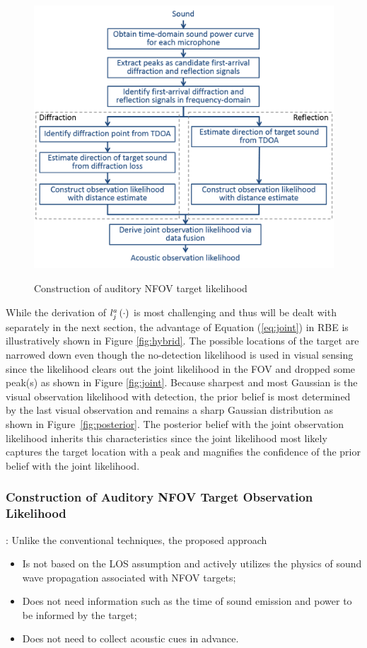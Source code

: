 \documentclass[letterpaper, 10 pt, conference]{ieeeconf}  %
\begin{document}
\begin{figure}[h]
	{\centering
		\includegraphics[height=0.40\textwidth]{Figures/auditory_procedure.png}
	}
	\caption{\footnotesize {Construction of auditory NFOV target likelihood} }
	\label{fig:auditory_procedure}
\end{figure}
While the derivation of $l_j^{a} \left ( \cdot \right )$ is most challenging and thus will be dealt with separately in the next section, the advantage of Equation (\ref{eq:joint}) in RBE is illustratively shown in Figure \ref{fig:hybrid}.  The possible locations of the target are narrowed down even though the no-detection likelihood is used in visual sensing since the likelihood clears out the joint likelihood in the FOV and dropped some peak(s) as shown in Figure \ref{fig:joint}. Because sharpest and most Gaussian is the visual observation likelihood with detection, the prior belief is most determined by the last visual observation and remains a sharp Gaussian distribution as shown in Figure~\ref{fig:posterior}.  The posterior belief with the joint observation likelihood inherits this characteristics since the joint likelihood most likely captures the target location with a peak and magnifies the confidence of the prior belief with the joint likelihood.  


\subsubsection{Construction of Auditory NFOV Target Observation Likelihood}

: Unlike the conventional techniques, the proposed approach 
\begin{itemize}
	\item Is not based on the LOS assumption and actively utilizes the physics of sound wave propagation associated with NFOV targets; 
	\item Does not need information such as the time of sound emission and power to be informed by the target;
	\item Does not need to collect acoustic cues in advance. 
\end{itemize}
\end{document}
